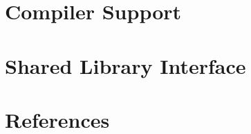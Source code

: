 \documentclass{scrartcl}
\newcommand{\mylisting}[2][]{%
}
\DeclareMathOperator*{\argmin}{arg\,min}
\begin{document}
%
%


\begin{appendices}

\makeatletter
{}
\makeatother


\section{Compiler Support}
\label{app:compiler}


\section{Shared Library Interface}
\label{app:so}

\mylisting[
  caption={[FFI usage example]FFI usage example.},
  firstline=8,fontadjust,language=C,
  label=lst:so]{../src/rstsp/librstsp/test.c}

%

\section{References}
\printbibliography%

\end{appendices}
\end{document}
